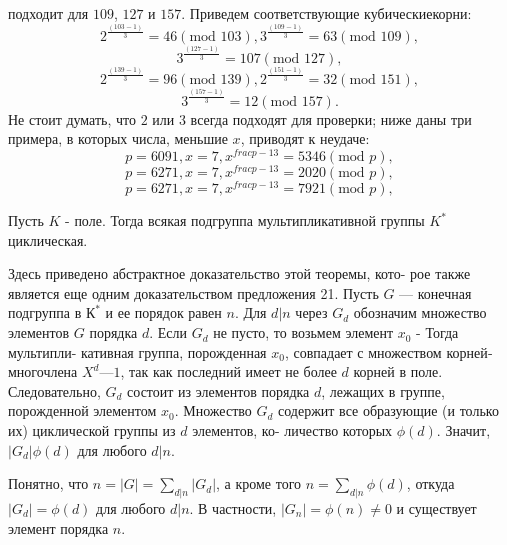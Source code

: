 \pagebreak
\noindent подходит для $109$, $127$ и $157$. Приведем соответствующие кубические\linebreak корни:
$$2^{\frac{(103-1)}{3}} = 46 (\text{mod } 103), 3^{\frac{(109-1)}{3}} = 63 (\text{mod } 109),$$
$$3^{\frac{(127-1)}{3}} = 107 (\text{mod } 127),$$
$$2^{\frac{(139-1)}{3}} = 96 (\text{mod } 139), 2^{\frac{(151-1)}{3}} = 32 (\text{mod } 151),$$
$$3^{\frac{(157-1)}{3}} = 12 (\text{mod } 157).$$
Не стоит думать, что $2$ или $3$ всегда подходят для проверки; ниже даны
три примера, в которых числа, меньшие $x$, приводят к неудаче:
$$p = 6091, x = 7, x^{frac{p - 1}{3}} = 5346(\text{mod }p),$$
$$p = 6271, x = 7, x^{frac{p - 1}{3}} = 2020(\text{mod }p),$$
$$p = 6271, x = 7, x^{frac{p - 1}{3}} = 7921(\text{mod }p),$$
\begin{thm}
Пусть $K$ - поле. Тогда всякая подгруппа мультипликативной группы $K^*$ циклическая.
\end{thm}
\begin{myproof}
Здесь приведено абстрактное доказательство этой теоремы, кото­-\linebreak
рое также является еще одним доказательством предложения 21.­\linebreak
Пусть $G$ — конечная подгруппа в $К^*$ и ее порядок равен $n$. Для­\linebreak
$d | n$ через $G_d$ обозначим множество элементов $G$ порядка $d$.­\linebreak
Если $G_d$ не пусто, то возьмем элемент $x_0$ - Тогда мультипли­-­\linebreak
кативная группа, порожденная $x_0$, совпадает с множеством корней­\linebreak
многочлена $X^d — 1$, так как последний имеет не более $d$ корней в­\linebreak
поле. Следовательно, $G_d$ состоит из элементов порядка $d$, лежащих­\linebreak
в группе, порожденной элементом $x_0$. Множество $G_d$ содержит все­\linebreak
образующие (и только их) циклической группы из $d$ элементов, ко­-­\linebreak
личество которых $\phi(d)$. Значит, $|G_d|\phi(d)$ для любого $d|n$.­

\noindent Понятно, что $n = |G| = \sum_{d|n} |G_d|$, а кроме того $n = \sum_{d|n}\phi(d)$,­\linebreak
откуда $|G_d| = \phi(d)$ для любого $d|n$. В частности, $|G_n| = \phi(n) \ne0$\linebreak
и существует элемент порядка $n$.
\end{myproof}
